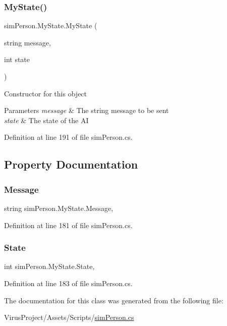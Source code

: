 \subsubsection{\texorpdfstring{My\+State()}{MyState()}}
{\footnotesize\ttfamily sim\+Person.\+My\+State.\+My\+State (\begin{DoxyParamCaption}\item[{string}]{message,  }\item[{int}]{state }\end{DoxyParamCaption})}

Constructor for this object


\begin{DoxyParams}{Parameters}
{\em message} & The string message to be sent \\
\hline
{\em state} & The state of the AI \\
\hline
\end{DoxyParams}


Definition at line 191 of file sim\+Person.\+cs.



\subsection{Property Documentation}
\hypertarget{classsim_person_1_1_my_state_ad0e3e9f33288888b8c76d70b1a78a460}{}\label{classsim_person_1_1_my_state_ad0e3e9f33288888b8c76d70b1a78a460} 
\subsubsection{\texorpdfstring{Message}{Message}}
{\footnotesize\ttfamily string sim\+Person.\+My\+State.\+Message\hspace{0.3cm}{\ttfamily [get]}, {\ttfamily [set]}}



Definition at line 181 of file sim\+Person.\+cs.

\hypertarget{classsim_person_1_1_my_state_a8ea6e800212a919c234ce917b0b75904}{}\label{classsim_person_1_1_my_state_a8ea6e800212a919c234ce917b0b75904} 
\subsubsection{\texorpdfstring{State}{State}}
{\footnotesize\ttfamily int sim\+Person.\+My\+State.\+State\hspace{0.3cm}{\ttfamily [get]}, {\ttfamily [set]}}



Definition at line 183 of file sim\+Person.\+cs.



The documentation for this class was generated from the following file\+:\begin{DoxyCompactItemize}
\item 
Virus\+Project/\+Assets/\+Scripts/\hyperlink{sim_person_8cs}{sim\+Person.\+cs}\end{DoxyCompactItemize}
